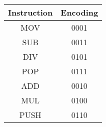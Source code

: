 \begin{tabular}{cc}
    \toprule
    \textbf{Instruction} & \textbf{Encoding} \\
    \midrule
    MOV                  & 0001              \\
    SUB                  & 0011              \\
    DIV                  & 0101              \\
    POP                  & 0111              \\
    ADD                  & 0010              \\
    MUL                  & 0100              \\
    PUSH                 & 0110              \\
    \bottomrule
\end{tabular}
